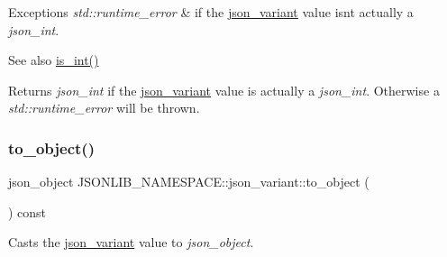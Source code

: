 \begin{DoxyExceptions}{Exceptions}
{\em std\+::runtime\+\_\+error} & if the \hyperlink{classJSONLIB__NAMESPACE_1_1json__variant}{json\+\_\+variant} value isn\textquotesingle{}t actually a {\itshape json\+\_\+int}. \\
\hline
\end{DoxyExceptions}
\begin{DoxySeeAlso}{See also}
\hyperlink{classJSONLIB__NAMESPACE_1_1json__variant_a2d6f7d2f92f5c3bfaf9c548a783a97fb}{is\+\_\+int()} 
\end{DoxySeeAlso}
\begin{DoxyReturn}{Returns}
{\itshape json\+\_\+int} if the \hyperlink{classJSONLIB__NAMESPACE_1_1json__variant}{json\+\_\+variant} value is actually a {\itshape json\+\_\+int}. Otherwise a {\itshape std\+::runtime\+\_\+error} will be thrown. 
\end{DoxyReturn}
\mbox{\label{classJSONLIB__NAMESPACE_1_1json__variant_a28035668bca7e7829340fe994581564d}} 
\subsubsection{\texorpdfstring{to\+\_\+object()}{to\_object()}\hspace{0.1cm}{\footnotesize\ttfamily [1/2]}}
{\footnotesize\ttfamily json\+\_\+object J\+S\+O\+N\+L\+I\+B\+\_\+\+N\+A\+M\+E\+S\+P\+A\+C\+E\+::json\+\_\+variant\+::to\+\_\+object (\begin{DoxyParamCaption}{ }\end{DoxyParamCaption}) const}



Casts the \hyperlink{classJSONLIB__NAMESPACE_1_1json__variant}{json\+\_\+variant} value to {\itshape json\+\_\+object}. 


